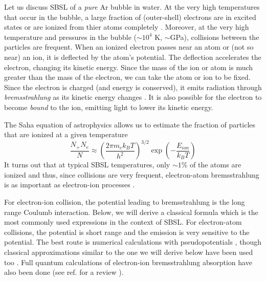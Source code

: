 \documentclass[prb,aps,nofootinbib,superscriptaddress,floatfix]{revtex4-2}
\begin{document}
Let us discuss SBSL of a \emph{pure} Ar bubble in water. At the very high temperatures that occur in the bubble, a large fraction of (outer-shell) electrons are in excited states or are ionized from thier atoms completely \cite{zel2002physics}. Moreover, at the very high temperature and pressures in the bubble ($\sim 10^4$ K, $\sim$GPa), collisions between the particles are frequent. When an ionized electron passes near an atom or (not so near) an ion, it is deflected by the atom's potential. The deflection accelerates the electron, changing its kinetic energy. Since the mass of the ion or atom is much greater than the mass of the electron, we can take the atom or ion to be fixed. Since the electron is charged (and energy is conserved), it emits radiation through \emph{bremsstrahlung} as its kinetic energy changes \cite{jackson1999classical,zel2002physics}. It is also possible for the electron to become \emph{bound} to the ion, emitting light to lower its kinetic energy.

The Saha equation of astrophysics allows us to estimate the fraction of particles that are ionized at a given temperature \cite{hilgenfeldt1999simple,an2006mechanism,zel2002physics}
\begin{equation}
    \frac{N_+ N_e}{N} \approx \left( \frac{2 \pi m_e k_B T}{h^2} \right)^{3/2} \exp \left(-\frac{E_{ion}}{ k_B T} \right)
    \label{eq:saha}
\end{equation}
It turns out that at typical SBSL temperatures, only $\sim 1\%$ of the atoms are ionized and thus, since collisions are very frequent, electron-atom bremsstrahlung is as important as electron-ion processes \cite{hilgenfeldt1999simple,an2006mechanism,flannigan2005plasma}. 

For electron-ion collision, the potential leading to bremsstrahlung is the long range Coulumb interaction. Below, we will derive a classical formula which is the most commonly used expressions in the context of SBSL. For electron-atom collisions, the potential is short range and the emission is very sensitive to the potential. The best route is numerical calculations with pseudopotentials \cite{geltman1973free}, though classical approximations similar to the one we will derive below have been used too \cite{hilgenfeldt1999simple,hilgenfeldt1999sonoluminescence,zel2002physics}. Full quantum calculations of electron-ion bremsstrahlung absorption have also been done (see ref. for a review \cite{eckert2015aether}).
\end{document}
